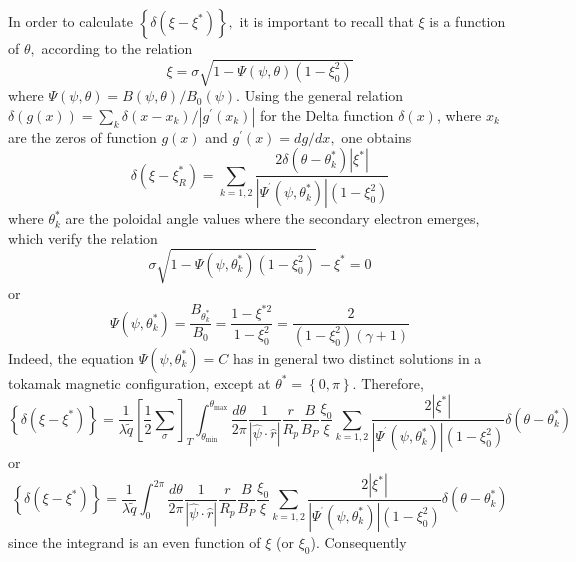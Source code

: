 In order to calculate $\left\{ \delta \left( \xi -\xi ^{*}\right) \right\} ,$
it is important to recall that $\xi $ is a function of $\theta ,$ according
to the relation
\begin{equation}
\xi =\sigma \sqrt{1-\Psi \left( \psi ,\theta \right) \left( 1-\xi
_{0}^{2}\right) }
\end{equation}
where $\Psi \left( \psi ,\theta \right) =B\left( \psi ,\theta \right)
/B_{0}\left( \psi \right) .$ Using the general relation $\delta \left(
g\left( x\right) \right) =\sum_{k}\delta \left( x-x_{k}\right) /\left|
g^{\prime }\left( x_{k}\right) \right| $ for the Delta function $\delta
\left( x\right) $, where $x_{k}$ are the zeros of function $g\left( x\right)
$ and $g^{\prime }\left( x\right) =dg/dx,$ one obtains
\begin{equation}
\delta \left( \xi -\xi _{R}^{*}\right) =\sum_{k=1,2}\frac{2\delta \left(
\theta -\theta _{k}^{*}\right) \left| \xi ^{*}\right| }{\left| \Psi
^{^{\prime }}\left( \psi ,\theta _{k}^{*}\right) \right| \left( 1-\xi
_{0}^{2}\right) }
\end{equation}
where $\theta _{k}^{*}$ are the poloidal angle values where the secondary
electron emerges, which verify the relation
\begin{equation}
\sigma \sqrt{1-\Psi \left( \psi ,\theta _{k}^{*}\right) \left( 1-\xi
_{0}^{2}\right) }-\xi ^{*}=0
\end{equation}
or
\begin{equation}
\Psi \left( \psi ,\theta _{k}^{*}\right) =\frac{B_{\theta _{k}^{*}}}{B_{0}}=%
\frac{1-\xi ^{*2}}{1-\xi _{0}^{2}}=\frac{2}{\left( 1-\xi _{0}^{2}\right)
\left( \gamma +1\right) }
\end{equation}
Indeed, the equation $\Psi \left( \psi ,\theta _{k}^{*}\right) =C$ has in
general two distinct solutions in a tokamak magnetic configuration, except
at $\theta ^{*}=\left\{ 0,\pi \right\} .$ Therefore,
\begin{equation}
\left\{ \delta \left( \xi -\xi ^{*}\right) \right\} =\frac{1}{\lambda
\widetilde{q}}\left[ \frac{1}{2}\sum_{\sigma }\right] _{T}\int_{\theta
_{\min }}^{\theta _{\max }}\frac{d\theta }{2\pi }\frac{1}{\left| \widehat{
\psi }\cdot \widehat{r}\right| }\frac{r}{R_{p}}\frac{B}{B_{P}}\frac{\xi _{0}%
}{\xi }\sum_{k=1,2}\frac{2\left| \xi ^{*}\right| }{\left| \Psi ^{^{\prime
}}\left( \psi ,\theta _{k}^{*}\right) \right| \left( 1-\xi _{0}^{2}\right) }%
\delta \left( \theta -\theta _{k}^{*}\right)
\end{equation}
or
\begin{equation}
\left\{ \delta \left( \xi -\xi ^{*}\right) \right\} =\frac{1}{\lambda
\widetilde{q}}\int_{0}^{2\pi }\frac{d\theta }{2\pi }\frac{1}{\left| \widehat{
\psi }\cdot \widehat{r}\right| }\frac{r}{R_{p}}\frac{B}{B_{P}}\frac{\xi _{0}%
}{\xi }\sum_{k=1,2}\frac{2\left| \xi ^{*}\right| }{\left| \Psi ^{^{\prime
}}\left( \psi ,\theta _{k}^{*}\right) \right| \left( 1-\xi _{0}^{2}\right) }%
\delta \left( \theta -\theta _{k}^{*}\right)
\end{equation}
since the integrand is an even function of $\xi $ (or $\xi _{0}$).
Consequently

